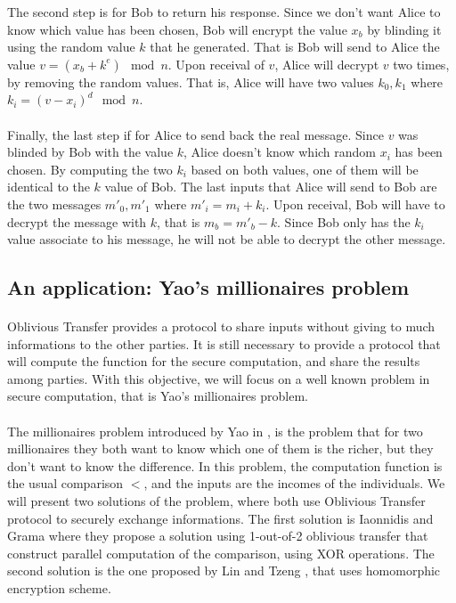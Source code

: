 \documentclass[11pt,a4paper]{article}
\begin{document}
The second step is for Bob to return his response. Since
we don't want Alice to know which value has been chosen, Bob
will encrypt the value $x_b$ by blinding it using the random value $k$
that he generated. That is Bob will send to Alice
the value $v = (x_b + k^e) \mod n$.
Upon receival of $v$, Alice will decrypt $v$ two times, by removing
the random values. That is, Alice will have two values $k_0, k_1$
where $k_i = (v - x_i)^d \mod n$.

\paragraph{}

Finally, the last step if for Alice to send back the real message.
Since $v$ was blinded by Bob
with the value $k$, Alice doesn't know which random $x_i$ has been chosen.
By computing the two $k_i$ based on both values, one of them
will be identical to the $k$ value of Bob. The last inputs that
Alice will send to Bob are the two messages $m'_0, m'_1$ where
$m'_i = m_i + k_i$. Upon receival, Bob will have to decrypt
the message with $k$, that is $m_b = m'_b - k$. Since Bob
only has the $k_i$ value associate to his message, he will not be
able to decrypt the other message.

\subsection{An application: Yao's millionaires problem}

\paragraph{}

Oblivious Transfer provides a protocol  to share inputs without
giving to much informations to the other parties. It is
still necessary to provide a protocol that will
compute the function for the secure computation, and share
the results among parties. With this objective, we will
focus on a well known problem in secure computation, that
is Yao's millionaires problem.

\paragraph{}

The millionaires problem introduced by Yao in
\cite{yao_protocols_1982}, is the problem that for two millionaires
they both want to know which one of them is the richer, but they
don't want to know the difference. In this problem, the computation
function is the usual comparison $<$, and the inputs are the incomes of
the individuals. We will present two solutions of the problem,
where both use Oblivious Transfer protocol to securely exchange
informations. The first solution is Iaonnidis and Grama
 \cite{ioannidis_efficient_2003} where
they propose a solution using 1-out-of-2 oblivious transfer that construct
parallel computation of the comparison, using XOR operations.
The second solution
is the one proposed by Lin and Tzeng
\cite{hutchison_efficient_2005}, that uses homomorphic encryption
scheme.
\end{document}
